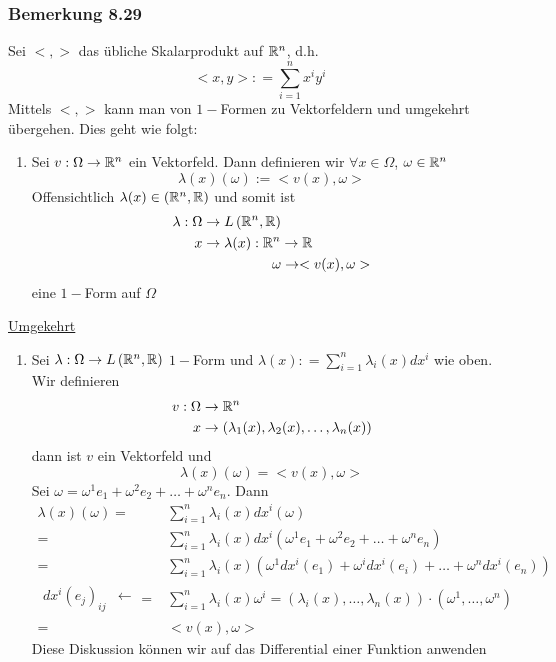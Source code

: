 \subsubsection*{Bemerkung 8.29}
Sei $<,>$ das übliche Skalarprodukt auf $\mathbb{R}^n$, d.h. \[ < x,y > : = \sum\limits_{i = 1}^n {{x^i}{y^i}} \]
Mittels $<,>$ kann man von $1-$Formen zu Vektorfeldern und umgekehrt übergehen. Dies geht wie folgt:
\begin{enumerate}
\item Sei $v:\Omega\to\mathbb{R}^n$ ein Vektorfeld. Dann definieren wir $\forall x\in\Omega$, $\omega\in\mathbb{R}^n$
\[\lambda (x)(\omega):= < v(x),\omega >\] Offensichtlich $\lambda (x)\in\left( \mathbb{R}^n, \mathbb{R}\right)$ und somit ist
\begin{align*}
\lambda : \Omega &\to L\left(\R^n, \R\right) \\
x &\to\lambda (x): \R^n \to\R\\
&\hspace{17.5mm}\omega \to <v(x),\omega >
\end{align*}
eine $1-$Form auf $\Omega$
\end{enumerate}
\underline{Umgekehrt}
\begin{enumerate}[\indent 2.]
\item Sei $\lambda :\Omega\to L\left(\mathbb{R}^n,\mathbb{R}\right)$ $1-$Form und $\lambda (x): = \sum\limits_{i = 1}^n {{\lambda _i}(x)d{x^i}} $ wie oben.\\

Wir definieren
\begin{align*}
v:\Omega &\to\mathbb{R}^n\\
x &\to \left( \lambda _1(x),\lambda _2(x),\dots,\lambda _n(x) \right)
\end{align*}
dann ist $v$ ein Vektorfeld und \[\lambda (x)(\omega)= < v(x),\omega>\] Sei $\omega = \omega^1e_1+\omega^2 e_2 + \dots + \omega^n e_n$. Dann
\begin{align*}
\lambda (x)(\omega ) = & \sum\limits_{i = 1}^n {{\lambda _i}(x)d{x^i}(\omega )}\\
= & \sum\limits_{i = 1}^n {{\lambda _i}(x)d{x^i}\left( {{\omega ^1}{e_1} + {\omega ^2}{e_2} +  \ldots  + {\omega ^n}{e_n}} \right)}\\
 = & \sum\limits_{i = 1}^n {{\lambda _i}(x)\left( {{\omega ^1}d{x^i}\left( {{e_1}} \right) + {\omega ^i}d{x^i}\left( {{e_i}} \right) +  \ldots  + {\omega ^n}d{x^i}\left( {{e_n}} \right)} \right)} \\
\begin{array}{*{20}{c}}
{d{x^i}{{\left( {{e_j}} \right)}_{ij}}}& \leftarrow
\end{array} = & \sum\limits_{i = 1}^n {{\lambda _i}(x){\omega ^i}}  = \left( {{\lambda _i}(x), \ldots ,{\lambda _n}(x)} \right) \cdot \left( {{\omega ^1}, \ldots ,{\omega ^n}} \right)\\
 = & < v(x),\omega  >
\end{align*}
Diese Diskussion können wir auf das Differential einer Funktion anwenden
\end{enumerate}

